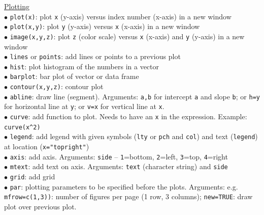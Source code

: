 \documentclass[a4paper,11pt,twocolumn,tablecaptionabove]{scrartcl}
\begin{document}
\noindent \underline{Plotting}\\
$\bullet$ \texttt{plot(x)}: plot \texttt{x} (y-axis) versus index number (x-axis) in a new window\\
$\bullet$ \texttt{plot(x,y)}: plot \texttt{y} (y-axis) versus \texttt{x} (x-axis) in a new window\\
$\bullet$ \texttt{image(x,y,z)}: plot \texttt{z} (color scale) versus \texttt{x} (x-axis) and \texttt{y} (y-axis) in a new window\\
$\bullet$ \texttt{lines} or \texttt{points}: add lines or points to a previous plot \\
$\bullet$ \texttt{hist}: plot histogram of the numbers in a vector\\
$\bullet$ \texttt{barplot}: bar plot of vector or data frame\\
$\bullet$ \texttt{contour(x,y,z)}: contour plot\\
$\bullet$ \texttt{abline}: draw line (segment). Arguments: \texttt{a,b} for intercept \texttt{a} and slope \texttt{b}; or \texttt{h=y} for horizontal line at \texttt{y}; or \texttt{v=x} for vertical line at \texttt{x}. \\
$\bullet$ \texttt{curve}: add function to plot. Needs to have an \texttt{x} in the expression. Example: \verb!curve(x^2)! \\
$\bullet$ \texttt{legend}: add legend with given symbols (\texttt{lty} or \texttt{pch} and \texttt{col}) and text (\texttt{legend}) at location (\texttt{x="topright"})\\
$\bullet$ \texttt{axis}: add axis. Arguments: \texttt{side} -- \texttt{1}=bottom, \texttt{2}=left, \texttt{3}=top, \texttt{4}=right\\
$\bullet$ \texttt{mtext}: add text on axis. Arguments: \texttt{text} (character string) and \texttt{side}\\
$\bullet$ \texttt{grid}: add grid\\
$\bullet$ \texttt{par}: plotting parameters to be specified before the plots.  Arguments: e.g. \texttt{mfrow=c(1,3))}: number of figures per page (1 row, 3 columns); \texttt{new=TRUE}: draw plot over previous plot.\\
\end{document}
